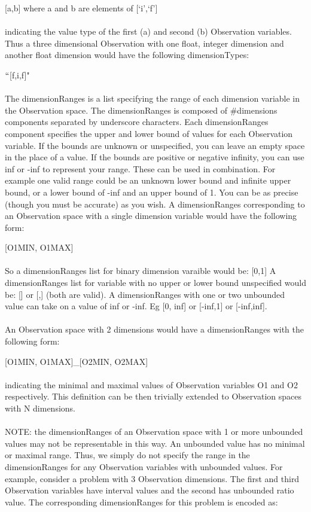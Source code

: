\documentclass[11pt]{article}
\begin{document}
\hspace{30 pt} [a,b] where a and b are elements of [`i',`f']
\\\\
indicating the value type of the first (a) and second (b) Observation variables. Thus a three dimensional Observation with one float, integer dimension and another float dimension would have the following dimensionTypes:

\hspace{30 pt} $``$[f,i,f]"
\\\\
The dimensionRanges is a list specifying the range of each dimension variable in the Observation space.  The dimensionRanges is composed of \#dimensions components separated by underscore characters. Each dimensionRanges component specifies the upper and lower bound of values for each Observation variable. If the bounds are unknown or unspecified, you can leave an empty space in the place of a value. If the bounds are positive or negative infinity, you can use inf or -inf to represent your range. These can be used in combination. For example one valid range could be an unknown lower bound and infinite upper bound, or a lower bound of -inf and an upper bound of 1. You can be as precise (though you must be accurate) as you wish. A dimensionRanges corresponding to an Observation space with a single dimension variable would have the following form:

\hspace{30 pt} [O1MIN, O1MAX]
\\\\
So a dimensionRanges list for binary dimension varaible would be: [0,1]
A dimensionRanges list for variable with no upper or lower bound unspecified would be: [] or [,] (both are valid).
A dimensionRanges with one or two unbounded value can take on a value of inf or -inf. Eg [0, inf] or [-inf,1] or [-inf,inf].
\\\\
An Observation space with 2 dimensions would have a dimensionRanges with the following form:

\hspace{30 pt} [O1MIN, O1MAX]\_[O2MIN, O2MAX]
\\\\
indicating the minimal and maximal values of Observation variables O1 and O2 respectively. This definition can be then trivially extended to Observation spaces with N dimensions.
\\\\
NOTE: the dimensionRanges of an Observation space with 1 or more unbounded values may not be representable in this way. An unbounded value has no minimal or maximal range. Thus, we simply do not specify the range in the dimensionRanges for any Observation variables with unbounded values. For example, consider a problem with 3 Observation dimensions. The first and third Observation variables have interval values and the second has unbounded ratio value. The corresponding dimensionRanges for this problem is encoded as:
\end{document}
